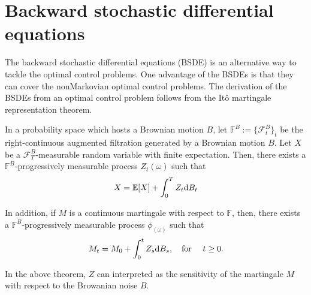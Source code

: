 \documentclass[11pt]{book}
\newcommand{\dd}{\text{\normalfont d}}
\begin{document}
\section{Backward stochastic differential equations}
\label{sec:BSDE}
The backward stochastic differential equations (BSDE) is an alternative way to tackle the optimal control problems. One advantage of the BSDEs is that they can  cover the nonMarkovian optimal control problems. The derivation of the BSDEs from an optimal control problem follows from the It\^o martingale representation theorem. 
\begin{thm}
In a probability space which hosts a Brownian motion $B$, let $\mathbb{F}^B:=\{\mathcal{F}^B_t\}_t$ be the right-continuous augmented filtration generated by a Brownian motion $B$. 
Let $X$ be a $\mathcal{F}^B_T$-measurable random variable with finite expectation. Then, there exists a $\mathbb{F}^B$-progressively measurable process $Z_t(\omega)$ such that 
\begin{equation}
X=\mathbb{E}[X]+\int_0^TZ_t{\dd}B_t
\end{equation}

In addition, if $M$ is a continuous martingale with respect to $\mathbb{F}$, then, there exists a $\mathbb{F}^B$-progressively measurable process $\phi_(\omega)$ such that 
\begin{equation}
M_t=M_0+\int_0^tZ_s{\dd}B_s,~~~\textrm{for }~~~ t\ge0.
\end{equation}
\end{thm}
In the above theorem, $Z$ can interpreted as the sensitivity of the martingale $M$ with respect to the Browanian noise $B$.
\end{document}
